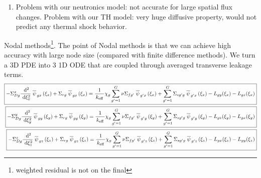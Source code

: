\documentclass{school-22.211-notes}
\begin{document}
\begin{enumerate}
  \item Problem with our neutronics model: not accurate for large spatial flux changes. Problem with our TH model: very huge diffusive property, would not predict any thermal shock behavior. 
\end{enumerate}

\clearpage
{} 
Nodal methods\footnote{weighted residual is not on the final}. The point of Nodal methods is that we can achieve high accuracy with large node size (compared with finite difference methods). We turn a 3D PDE into 3 1D ODE that are coupled through averaged transverse leakage terms. 
    \begin{align*}
      \boxed{ - \Sigma_{Dg}^x \frac{\mbox{ }\mathrm{d}^2}{\mbox{ }\mathrm{d} \xi_x^2} \left.\overline{\psi} \right._{gx} (\xi_x) + \Sigma_{rg} \left.\overline{\psi} \right._{gx} (\xi_x) = \frac{1}{\left. k_{\mathrm{eff}} \right.} \chi_g \displaystyle\sum_{g'=1}^G \nu \Sigma_{fg'} \left.\overline{\psi} \right._{g'x} (\xi_x) + \displaystyle\sum_{g'=1}^G \Sigma_{sg'g} \left.\overline{\psi} \right._{g'x} (\xi_x) - L_{gy} (\xi_x) - L_{gz} (\xi_x) }    \\
   \boxed{ - \Sigma_{Dg}^y \frac{\mbox{ }\mathrm{d}^2}{\mbox{ }\mathrm{d} \xi_y^2} \left.\overline{\psi} \right._{gy} (\xi_y) + \Sigma_{rg} \left.\overline{\psi} \right._{gy} (\xi_y) = \frac{1}{\left. k_{\mathrm{eff}} \right.} \chi_g \displaystyle\sum_{g'=1}^G \nu \Sigma_{fg'} \left.\overline{\psi} \right._{g'y} (\xi_y) + \displaystyle\sum_{g'=1}^G \Sigma_{sg'g} \left.\overline{\psi} \right._{g'y} (\xi_y) - L_{gz} (\xi_y) - L_{gx} (\xi_y) }  \\
     \boxed{ - \Sigma_{Dg}^z \frac{\mbox{ }\mathrm{d}^2}{\mbox{ }\mathrm{d} \xi_z^2} \left.\overline{\psi} \right._{gz} (\xi_z) + \Sigma_{rg} \left.\overline{\psi} \right._{gz} (\xi_z) = \frac{1}{\left. k_{\mathrm{eff}} \right.} \chi_g \displaystyle\sum_{g'=1}^G \nu \Sigma_{fg'} \left.\overline{\psi} \right._{g'z} (\xi_z) + \displaystyle\sum_{g'=1}^G \Sigma_{sg'g} \left.\overline{\psi} \right._{g'z} (\xi_z) - L_{gx} (\xi_z) - L_{gy} (\xi_z) } 
    \end{align*}
\end{document}
